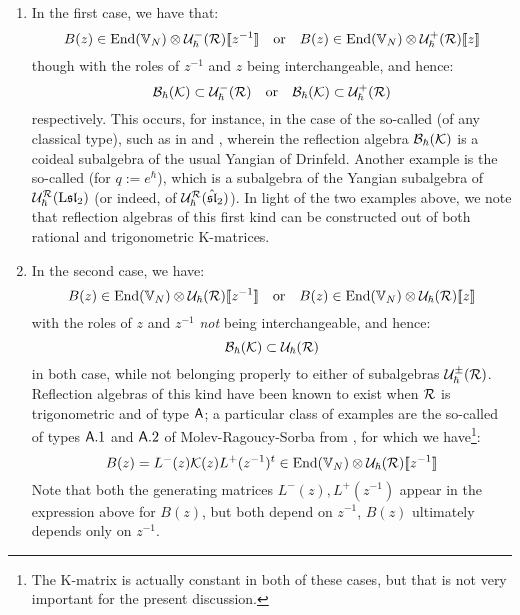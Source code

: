         \begin{enumerate}
            \item In the first case, we have that:
                $$B(z) \in \End(\bbV_N) \tensor \calU_{\hbar}^-(\calR)[\![z^{-1}]\!] \quad \text{or} \quad B(z) \in \End(\bbV_N) \tensor \calU_{\hbar}^+(\calR)[\![z]\!]$$
            though with the roles of $z^{-1}$ and $z$ being interchangeable, and hence:
                $$\mathcal{B}_{\hbar}(\mathcal{K}) \subset \mathcal{U}_{\hbar}^-(\mathcal{R}) \quad \text{or} \quad \mathcal{B}_{\hbar}(\mathcal{K}) \subset \mathcal{U}_{\hbar}^+(\mathcal{R})$$
            respectively. This occurs, for instance, in the case of the so-called  (of any classical type), such as in \cite[Chapter 2]{molev_yangians_and_classical_lie_algebras} and \cite{guay_regelskis_twisted_yangians_for_symmetric_pairs_of_types_BCD}, wherein the reflection algebra $\mathcal{B}_{\hbar}(\mathcal{K})$ is a coideal subalgebra of the usual Yangian of Drinfeld. Another example is the so-called  (for $q := e^{\hbar}$), which is a subalgebra of the Yangian subalgebra of $\mathcal{U}_{\hbar}^{\mathcal{R}}(\mathrm{L} \mathfrak{sl}_2)$ (or indeed, of $\mathcal{U}_{\hbar}^{\mathcal{R}}(\hat{\mathfrak{sl}}_2)$). In light of the two examples above, we note that reflection algebras of this first kind can be constructed out of both rational and trigonometric K-matrices.
            \item In the second case, we have:
                $$B(z) \in \End(\bbV_N) \tensor \calU_{\hbar}(\calR)[\![z^{-1}]\!] \quad \text{or} \quad B(z) \in \End(\bbV_N) \tensor \calU_{\hbar}(\calR)[\![z]\!]$$
            with the roles of $z$ and $z^{-1}$ \textit{not} being interchangeable, and hence:
                $$\mathcal{B}_{\hbar}(\mathcal{K}) \subset \mathcal{U}_{\hbar}(\mathcal{R})$$
            in both case, while not belonging properly to either of subalgebras $\mathcal{U}_{\hbar}^{\pm}(\mathcal{R})$. Reflection algebras of this kind have been known to exist when $\mathcal{R}$ is trigonometric and of type $\mathsf{A}$; a particular class of examples are the so-called  of types $\mathsf{A}.1$ and $\mathsf{A}.2$ of Molev-Ragoucy-Sorba from \cite{molev_ragoucy_sorba_twisted_q_yangians_type_A}, for which we have\footnote{The K-matrix is actually constant in both of these cases, but that is not very important for the present discussion.}:
                $$B(z) = L^-(z) \calK(z) L^+(z^{-1})^t \in \End(\bbV_N) \tensor \calU_{\hbar}(\calR)[\![z^{-1}]\!]$$
            Note that both the generating matrices $L^-(z), L^+(z^{-1})$ appear in the expression above for $B(z)$, but both depend on $z^{-1}$, $B(z)$ ultimately depends only on $z^{-1}$.
        \end{enumerate}
